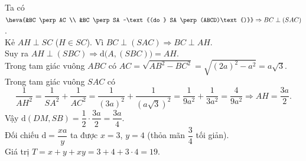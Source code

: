 \begin{ex}
{		Ta có $\heva{&BC \perp AC \\ &BC \perp SA ~\text{(do } SA \perp (ABCD)\text{)}} \Rightarrow BC \perp (SAC)$.\\
		Kẻ $AH \perp SC$ ($H \in SC$). Vì $BC \perp (SAC) \Rightarrow BC \perp AH$.\\
		Suy ra $AH \perp (SBC) \Rightarrow \mathrm{d}\big(A, (SBC)\big) = AH$.\\
		Trong tam giác vuông $ABC$ có $AC = \sqrt{AB^2 - BC^2} = \sqrt{(2a)^2 - a^2} = a\sqrt{3}$.\\
		Trong tam giác vuông $SAC$ có  
		\[ \dfrac{1}{AH^2} = \dfrac{1}{SA^2} + \dfrac{1}{AC^2} = \dfrac{1}{(3a)^2} + \dfrac{1}{(a\sqrt{3})^2} = \dfrac{1}{9a^2} + \dfrac{1}{3a^2} = \dfrac{4}{9a^2} \Rightarrow AH = \dfrac{3a}{2}. \]
		Vậy $\mathrm{d}(DM, SB) = \dfrac{1}{2} \cdot \dfrac{3a}{2} = \dfrac{3a}{4}$.\\
		Đối chiếu $\mathrm{d} = \dfrac{xa}{y}$ ta được $x = 3$, $y = 4$ (thỏa mãn $\dfrac{3}{4}$ tối giản).\\
		Giá trị $T = x + y + xy = 3 + 4 + 3 \cdot 4 = 19$.
	}
\end{ex}

